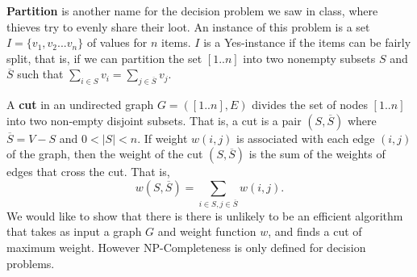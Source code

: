 \documentclass[11pt]{article}
\begin{document}
\textbf{Partition} is another name for the decision problem we saw in class,
where thieves try to evenly share their loot. An instance of this
problem is a set $I = \{v_1, v_2 ... v_n\}$ of values for $n$ items.
$I$ is a Yes-instance if the items can be fairly split, that is, if we
can partition the set $[1..n]$ into two nonempty subsets $S$ and
$\overline{S}$ such that $\sum_{i\in S}v_i = \sum_{j \in \overline{S}}
v_j$.

A \textbf{cut} in an undirected graph $G=([1..n],E)$ divides the set of nodes $[1..n]$ into
two non-empty disjoint subsets. That is, a cut is a pair $(S,
\overline{S})$ where $\overline{S} = V-S$
and $0 < |S| < n$. If weight $w(i,j)$ is associated with each edge $(i,j)$ of the graph,
then the weight of the cut $(S,\overline{S})$ is the sum of
the weights of edges that cross the cut. That is,
\[
w(S,\overline{S}) = \sum_{i \in S, j \in \overline{S}} w(i,j).
\]
We would like to show that there is there is unlikely to be an
efficient algorithm that takes as input a graph $G$ and weight
function $w$, and finds a cut of maximum weight. However
NP-Completeness is only defined for decision problems.
\end{document}
